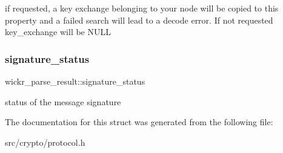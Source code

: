 if requested, a key exchange belonging to your node will be copied to this property and a failed search will lead to a decode error. If not requested key\+\_\+exchange will be N\+U\+LL \mbox{\label{structwickr__parse__result_a989166b5471898853f03b9e9c58f69c0}} 
\subsubsection{\texorpdfstring{signature\+\_\+status}{signature\_status}}
{\footnotesize\ttfamily wickr\+\_\+parse\+\_\+result\+::signature\+\_\+status}

status of the message signature 

The documentation for this struct was generated from the following file\+:\begin{DoxyCompactItemize}
\item 
src/crypto/protocol.\+h\end{DoxyCompactItemize}
